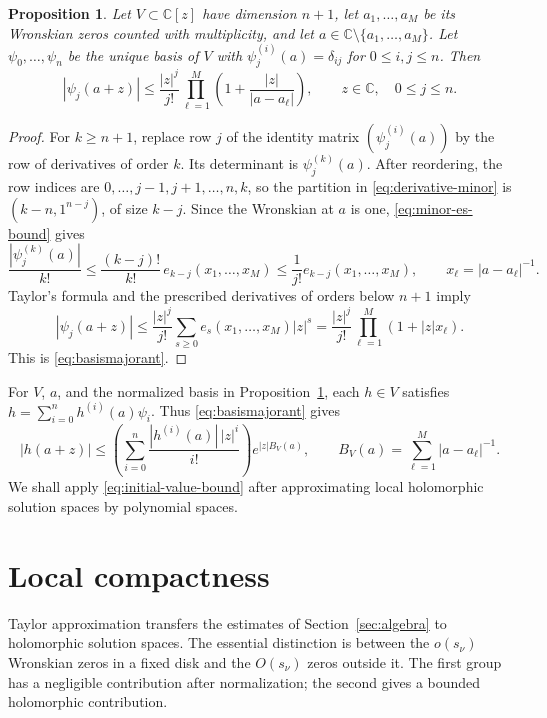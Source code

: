 \documentclass[11pt,letterpaper,reqno]{amsart}
\newtheorem{prop}[thm]{Proposition}
\theoremstyle{remark}
\numberwithin{equation}{section}
\newcommand{\C}{\mathbb C}
\begin{document}
\begin{prop}\label{prop:initial-basis}
Let $V\subset\C[z]$ have dimension $n+1$, let $a_1,\ldots,a_M$ be
its Wronskian zeros counted with multiplicity, and let
$a\in\C\setminus\{a_1,\ldots,a_M\}$. Let
$\psi_0,\ldots,\psi_n$ be the unique basis of $V$ with
$\psi_j^{(i)}(a)=\delta_{ij}$ for $0\leq i,j\leq n$. Then
\begin{equation}\label{eq:basismajorant}
 |\psi_j(a+z)|\le\frac{|z|^j}{j!}
       \prod_{\ell=1}^M\left(1+\frac{|z|}{|a-a_\ell|}\right),
 \qquad z\in\C,\quad 0\le j\le n.
\end{equation}
\end{prop}
\begin{proof}
For $k\ge n+1$, replace row $j$ of the identity matrix
$(\psi_j^{(i)}(a))$ by the row of derivatives of order $k$. Its determinant
is $\psi_j^{(k)}(a)$. After reordering, the row indices are
$0,\ldots,j-1,j+1,\ldots,n,k$, so the partition in
\eqref{eq:derivative-minor} is $(k-n,1^{n-j})$, of size $k-j$.
Since the Wronskian at $a$ is one, \eqref{eq:minor-es-bound} gives
\[
 \frac{|\psi_j^{(k)}(a)|}{k!}
 \le\frac{(k-j)!}{k!}\,e_{k-j}(x_1,\ldots,x_M)
 \le\frac1{j!}e_{k-j}(x_1,\ldots,x_M),
 \qquad x_\ell=|a-a_\ell|^{-1}.
\]
Taylor's formula and the prescribed derivatives of orders below $n+1$ imply
\[
 |\psi_j(a+z)|
 \le\frac{|z|^j}{j!}\sum_{s\ge0}e_s(x_1,\ldots,x_M)|z|^s
 =\frac{|z|^j}{j!}\prod_{\ell=1}^M(1+|z|x_\ell).
\]
This is \eqref{eq:basismajorant}.
\end{proof}

For $V$, $a$, and the normalized basis in
Proposition~\ref{prop:initial-basis}, each $h\in V$ satisfies
$h=\sum_{i=0}^{n}h^{(i)}(a)\psi_i$. Thus
\eqref{eq:basismajorant} gives
\begin{equation}\label{eq:initial-value-bound}
 |h(a+z)|\le
 \left(\sum_{i=0}^{n}\frac{|h^{(i)}(a)|\,|z|^i}{i!}\right)e^{|z|B_V(a)},
 \qquad B_V(a)=\sum_{\ell=1}^M|a-a_\ell|^{-1}.
\end{equation}
We shall apply \eqref{eq:initial-value-bound} after approximating local
holomorphic solution spaces by polynomial spaces.

\section{Local compactness}\label{sec:compactness}

Taylor approximation transfers the estimates of Section~\ref{sec:algebra}
to holomorphic solution spaces. The essential distinction is between the
$o(s_\nu)$ Wronskian zeros in a fixed disk and the $O(s_\nu)$ zeros outside
it. The first group has a negligible contribution after normalization; the
second gives a bounded holomorphic contribution.
\end{document}
